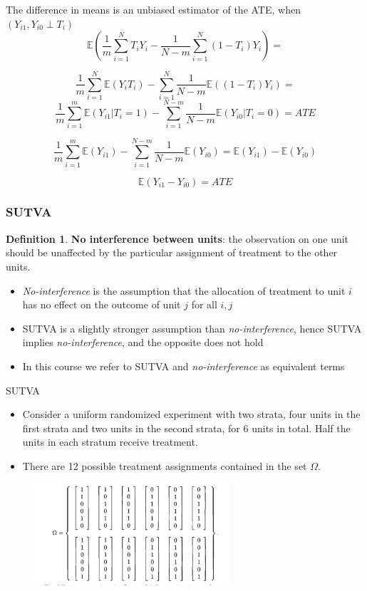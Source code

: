 \documentclass[handout]{beamer}
\theoremstyle{definition}
\newtheorem{defn}{Definition}[section]
\begin{document}
\begin{frame}
The difference in means is an unbiased estimator of the ATE, when $(Y_{i1},Y_{i0}\perp T_i)$
$$ \mathbb{E}\left( \frac{1}{m} \sum_{i=1}^N T_i Y_i - \frac{1}{N-m} \sum_{i=1}^N (1-T_i) Y_i \right) = $$

$$ \frac{1}{m} \sum_{i=1}^N \mathbb{E}\left( Y_{i} T_i \right) - \sum_{i=1}^N \frac{1}{N-m} \mathbb{E} \left((1-T_i) Y_i \right) = $$
$$ \frac{1}{m} \sum_{i=1}^m \mathbb{E}\left( Y_{i1}| T_i=1 \right) - \sum_{i=1}^{N-m} \frac{1}{N-m} \mathbb{E} \left( Y_{i0}|T_i=0 \right) = ATE $$

$$ \frac{1}{m} \sum_{i=1}^m \mathbb{E}\left( Y_{i1} \right) - \sum_{i=1}^{N-m} \frac{1}{N-m} \mathbb{E} \left( Y_{i0} \right) =  \mathbb{E}\left( Y_{i1} \right) - \mathbb{E}\left( Y_{i0} \right)$$

$$ \mathbb{E}\left( Y_{i1}-Y_{i0} \right) = ATE$$
\end{frame}

	\begin{frame}[t]\frametitle{SUTVA}
	\begin{defn}{\textbf{No interference between units}:}
	the observation on one unit should be unaffected by the particular  assignment of treatment to the other units.
	\end{defn}
	\pause
	\begin{itemize}
	\item \textit{No-interference} is the assumption that the allocation of treatment to unit $i$ has no effect on the outcome of unit $j$ for all $i,j$
	\item SUTVA is a slightly stronger assumption than \textit{no-interference}, hence SUTVA implies \textit{no-interference}, and the opposite does not hold
	\item In this course we refer to SUTVA and \textit{no-interference} as equivalent terms 
	\end{itemize}
	\end{frame}
	
	\begin{frame}{SUTVA}
		\begin{itemize}
			\item Consider a uniform randomized experiment with two strata, four units in the first strata and two units in the second strata, for 6 units in total. Half the units in each stratum receive treatment. 
			\item There are 12 possible treatment assignments contained in the set $\Omega$.			
		\end{itemize}
		\begin{figure}
			\centering
				\includegraphics[height=1.5in]{omega.png}
			\label{fig:omega}
		\end{figure}		
	\end{frame}
\end{document}
